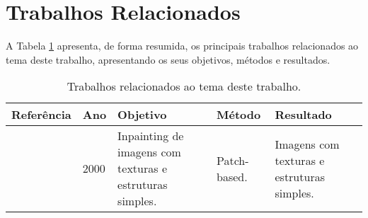 \section{Trabalhos Relacionados} \label{related}

A Tabela \ref{related-works} apresenta, de forma resumida, os principais trabalhos relacionados ao tema deste trabalho, apresentando os seus objetivos, métodos e resultados.

\begin{table}[h]
\centering
\caption{Trabalhos relacionados ao tema deste trabalho.}
\label{related-works}
\begin{tabularx}{\linewidth}{|l|l|X|X|X|}
\hline
\textbf{Referência} & \textbf{Ano} & \textbf{Objetivo} & \textbf{Método} & \textbf{Resultado} \\
\hline
\cite{Bertalmio2000} & 2000 & Inpainting de imagens com texturas e estruturas simples. & Patch-based. & Imagens com texturas e estruturas simples. \\


\hline

\end{tabularx}
\end{table}







